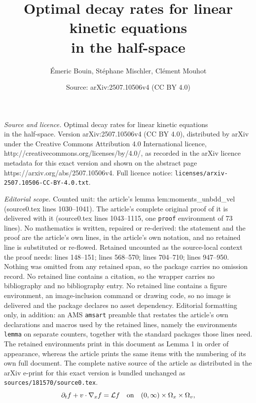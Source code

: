 \documentclass[10pt,a4paper]{amsart}
\title{Optimal decay rates for linear kinetic equations \\ in the half-space}
\author{\'Emeric Bouin, St\'ephane Mischler, Cl\'ement Mouhot}
\date{Source: arXiv:2507.10506v4 (CC BY 4.0)}
\newcommand{\cL}{\mathcal{L}}
\begin{document}
\maketitle

\noindent\emph{Source and licence.} Optimal decay rates for linear kinetic equations \\ in the half-space. Version arXiv:2507.10506v4 (CC BY 4.0), distributed by arXiv under the Creative Commons Attribution 4.0 International licence, http://creativecommons.org/licenses/by/4.0/, as recorded in the arXiv licence metadata for this exact version and shown on the abstract page https://arxiv.org/abs/2507.10506v4. Full licence notice: \texttt{licenses/arxiv-2507.10506-CC-BY-4.0.txt}.\par\smallskip

\noindent\textit{Editorial scope.} Counted unit: the article's lemma lem:moments\_unbdd\_vel (source0.tex lines 1030--1041). The article's complete original proof of it is delivered with it (source0.tex lines 1043--1115, one \texttt{proof} environment of 73 lines). No mathematics is written, repaired or re-derived: the statement and the proof are the article's own lines, in the article's own notation, and no retained line is substituted or re-flowed.  Retained uncounted as the source-local context the proof needs: lines 148--151; lines 568--570; lines 704--710; lines 947--950.  Nothing was omitted from any retained span, so the package carries no omission record.  No retained line contains a citation, so the wrapper carries no bibliography and no bibliography entry.  No retained line contains a figure environment, an image-inclusion command or drawing code, so no image is delivered and the package declares no asset dependency.  Editorial formatting only, in addition: an AMS \texttt{amsart} preamble that restates the article's own declarations and macros used by the retained lines, namely the environments \texttt{lemma} on separate counters, together with the standard packages those lines need.  The retained environments print in this document as Lemma 1 in order of appearance, whereas the article prints the same items with the numbering of its own full document.  The complete native source of the article as distributed in the arXiv e-print for this exact version is bundled unchanged as \texttt{sources/181570/source0.tex}.
\begin{equation}
  \label{eq:main}
  \partial_t f + v \cdot \nabla_x f = \cL f \quad \hbox{on}\quad (0,\infty) \times \Omega_x \times \Omega_v,
\end{equation}
\end{document}
